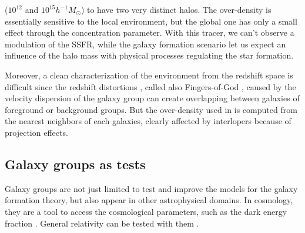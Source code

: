 ($10^{12}$ and $10^{15} h^{-1} M_\odot$) to have two very distinct halos. The
over-density is essentially sensitive to the local environment, but the global
one has only a small effect through the concentration parameter. With this
tracer, we can't observe a modulation of the SSFR\@, while the galaxy formation
scenario let us expect an influence of the halo mass with physical processes
regulating the star formation.
%

Moreover, a clean characterization of the environment from the redshift space
is difficult since the redshift distortions \citep{Jackson+72}, called also
Fingers-of-God \citep{Tully+78}, caused by the velocity dispersion of the
galaxy group can create overlapping between galaxies of foreground or
background groups. But the over-density used in \citet{Peng+10} is computed
from the nearest neighbors of each galaxies, clearly affected by interlopers
because of projection effects.

\subsection{Galaxy groups as tests}
\label{sub:galaxy_groups_as_tests}

Galaxy groups are not just limited to test and improve the models for the
galaxy formation theory, but also appear in other astrophysical domains. In
cosmology, they are a tool to access the cosmological parameters, such as
the dark energy fraction \citep{Wang+98}. General relativity can be tested
with them \citep{Wojtak+11}. 

